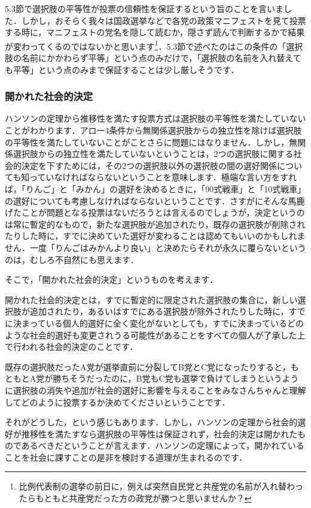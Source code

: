 5.3節で選択肢の平等性が投票の信頼性を保証するという旨のことを言いました．しかし，おそらく我々は国政選挙などで各党の政策マニフェストを見て投票する時に，マニフェストの党名を隠して読むか，隠さず読んで判断するかで結果が変わってくるのではないかと思います\footnote{比例代表制の選挙の前日に，例えば突然自民党と共産党の名前が入れ替わったらもともと共産党だった方の政党が勝つと思いませんか？}．5.3節で述べたのはこの条件の「選択肢の名前にかかわらず平等」という点のみだけで，「選択肢の名前を入れ替えても平等」という点のみまで保証することは少し厳しそうです．

\subsubsection*{開かれた社会的決定}
ハンソンの定理から推移性を満たす投票方式は選択肢の平等性を満たしていないことがわかります．アロー4条件から無関係選択肢からの独立性を除けば選択肢の平等性を満たしていないことがことさらに問題にはなりません．しかし，無関係選択肢からの独立性を満たしていないということは，2つの選択肢に関する社会的決定を下すためには，その2つの選択肢以外の選択肢の間の選好関係についても知っていなければならないということを意味します．極端な言い方をすれば，「りんご」と「みかん」の選好を決めるときに，「90式戦車」と「10式戦車」の選好についても考慮しなければならないということです．さすがにそんな馬鹿げたことが問題となる投票はないだろうとは言えるのでしょうが，決定というのは常に暫定的なもので，新たな選択肢が追加されたり，既存の選択肢が削除されたりした時に，すでに決めていた選好が変わることは認めてもいいのかもしれません．一度「りんごはみかんより良い」と決めたらそれが永久に覆らないというのは，むしろ不自然にも思えます．

そこで，「開かれた社会的決定」というものを考えます．

\begin{dfn}
    開かれた社会的決定とは，すでに暫定的に限定された選択肢の集合に，新しい選択肢が追加されたり，あるいはすでにある選択肢が除外されたりした時に，すでに決まっている個人的選好に全く変化がないとしても，すでに決まっているどのような社会的選好も変更されうる可能性があることをすべての個人が了承した上で行われる社会的決定のことです．
\end{dfn}

既存の選択肢だったA党が選挙直前に分裂してB党とC党になったりすると，もともとA党が勝ちそうだったのに，B党もC党も選挙で負けてしまうというように選択肢の消失や追加が社会的選好に影響を与えることをみなさんちゃんと理解してどのように投票するか決めてくださいということです．

それがどうした，という感じもあります．しかし，ハンソンの定理から社会的選好が推移性を満たすなら選択肢の平等性は保証されず，社会的決定は開かれたものであるべきだということが言えます．ハンソンの定理によって，開かれていることを社会に課すことの是非を検討する道理が生まれるのです．

